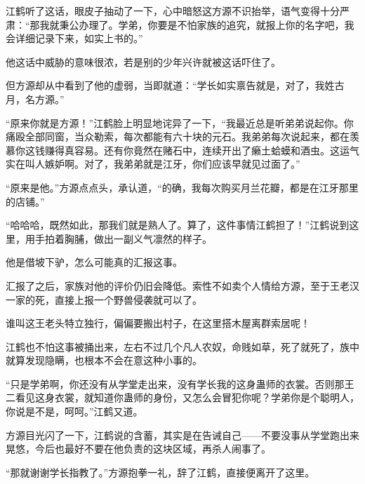 \begin{this_body}
江鹤听了这话，眼皮子抽动了一下，心中暗怒这方源不识抬举，语气变得十分严肃：“那我就秉公办理了。学弟，你要是不怕家族的追究，就报上你的名字吧，我会详细记录下来，如实上书的。”

他这话中威胁的意味很浓，若是别的少年兴许就被这话吓住了。

但方源却从中看到了他的虚弱，当即就道：“学长如实禀告就是，对了，我姓古月，名方源。”

“原来你就是方源！”江鹤脸上明显地诧异了一下，“我最近总是听弟弟说起你。你痛殴全部同窗，当众勒索，每次都能有六十块的元石。我弟弟每次说起来，都在羡慕你这钱赚得真容易。还有你竟然在赌石中，连续开出了癞土蛤蟆和酒虫。这运气实在叫人嫉妒啊。对了，我弟弟就是江牙，你们应该早就见过面了。”

“原来是他。”方源点点头，承认道，“的确，我每次购买月兰花瓣，都是在江牙那里的店铺。”

“哈哈哈，既然如此，那我们就是熟人了。算了，这件事情江鹤担了！”江鹤说到这里，用手拍着胸脯，做出一副义气凛然的样子。

他是借坡下驴，怎么可能真的汇报这事。

汇报了之后，家族对他的评价仍旧会降低。索性不如卖个人情给方源，至于王老汉一家的死，直接上报一个野兽侵袭就可以了。

谁叫这王老头特立独行，偏偏要搬出村子，在这里搭木屋离群索居呢！

江鹤也不怕这事被捅出来，左右不过几个凡人农奴，命贱如草，死了就死了，族中就算发现隐瞒，也根本不会在意这种小事的。

“只是学弟啊，你还没有从学堂走出来，没有学长我的这身蛊师的衣裳。否则那王二看见这身衣裳，就知道你蛊师的身份，又怎么会冒犯你呢？学弟你是个聪明人，你说是不是，呵呵。”江鹤又道。

方源目光闪了一下，江鹤说的含蓄，其实是在告诫自己——不要没事从学堂跑出来晃悠，今后也最好不要在他负责的这块区域，再杀人闹事了。

“那就谢谢学长指教了。”方源抱拳一礼，辞了江鹤，直接便离开了这里。

\end{this_body}

